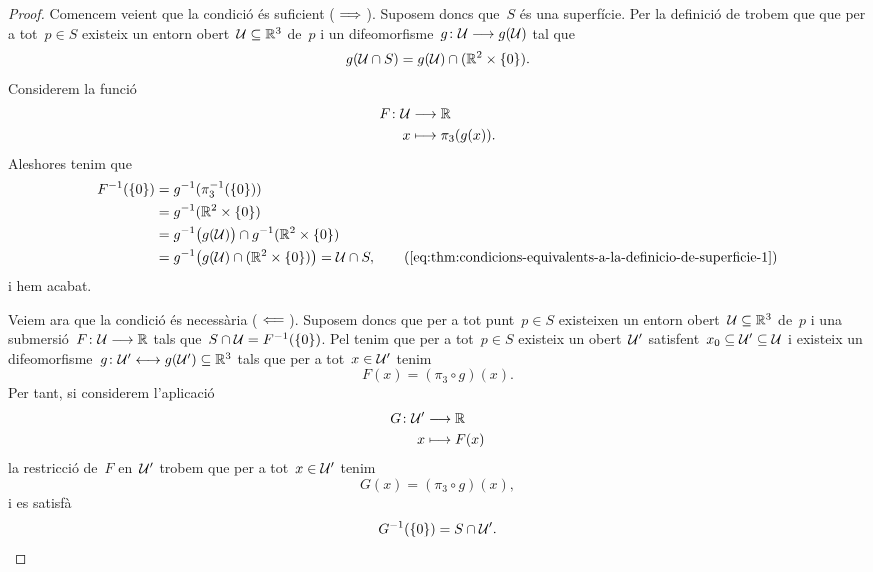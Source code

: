 \documentclass[../geometria-diferencial.tex]{subfiles}
\begin{document}
    \begin{proof}
        Comencem veient que la condició és suficient (\(\implies\)).
        Suposem doncs que~\(S\) és una superfície.
        Per la definició de  trobem que que per a tot~\(p\in S\) existeix un entorn obert~\(\mathcal{U}\subseteq\mathbb{R}^{3}\) de~\(p\) i un difeomorfisme~\(g\colon\mathcal{U}\longrightarrow g(\mathcal{U})\) tal que
        \begin{equation}
            \label{eq:thm:condicions-equivalents-a-la-definicio-de-superficie-1}
            g(\mathcal{U}\cap S)=g(\mathcal{U})\cap(\mathbb{R}^{2}\times\{0\}).
        \end{equation}
        Considerem la funció
        \begin{align*}
            F\colon\mathcal{U}&\longrightarrow\mathbb{R} \\
            x&\longmapsto\pi_{3}(g(x)).
        \end{align*}
        Aleshores tenim que
        \begin{align*}
            F^{-1}(\{0\})&=g^{-1}(\pi_{3}^{-1}(\{0\})) \\
            &=g^{-1}(\mathbb{R}^{2}\times\{0\}) \\
            &=g^{-1}\big(g(\obert{U})\big)\cap g^{-1}(\mathbb{R}^{2}\times\{0\})\\
            &=g^{-1}\big(g(\obert{U})\cap(\mathbb{R}^{2}\times\{0\})\big)=\obert{U}\cap S, \tag{\ref{eq:thm:condicions-equivalents-a-la-definicio-de-superficie-1}} %
        \end{align*}
        i hem acabat.

        Veiem ara que la condició és necessària (\(\impliedby\)).
        Suposem doncs que per a tot punt~\(p\in S\) existeixen un entorn obert~\(\mathcal{U}\subseteq\mathbb{R}^{3}\) de~\(p\) i una submersió~\(F\colon\mathcal{U}\longrightarrow\mathbb{R}\) tals que~\(S\cap\mathcal{U}=F^{-1}(\{0\})\).
        Pel  tenim que per a tot~\(p\in S\) existeix un obert~\(\mathcal{U}'\) satisfent~\(x_{0}\subseteq\mathcal{U}'\subseteq\mathcal{U}\) i existeix un difeomorfisme~\(g\colon\mathcal{U}'\longleftrightarrow g(\mathcal{U}')\subseteq\mathbb{R}^{3}\) tals que per a tot~\(x\in\mathcal{U}'\) tenim
        \[
            F(x)=(\pi_{3}\circ g)(x).
        \]
        Per tant, si considerem l'aplicació
        \begin{align*}
            G\colon\mathcal{U}'&\longrightarrow\mathbb{R} \\
            x&\longmapsto F(x)
        \end{align*}
        la restricció de~\(F\) en~\(\mathcal{U}'\) trobem que per a tot~\(x\in\mathcal{U}'\) tenim
        \[
            G(x)=(\pi_{3}\circ g)(x),
        \]
        i es satisfà
        \begin{equation}
            \label{eq:thm:condicions-equivalents-a-la-definicio-de-superficie-2}
            G^{-1}(\{0\})=S\cap\mathcal{U}'.
        \end{equation}


\end{proof}
\end{document}
